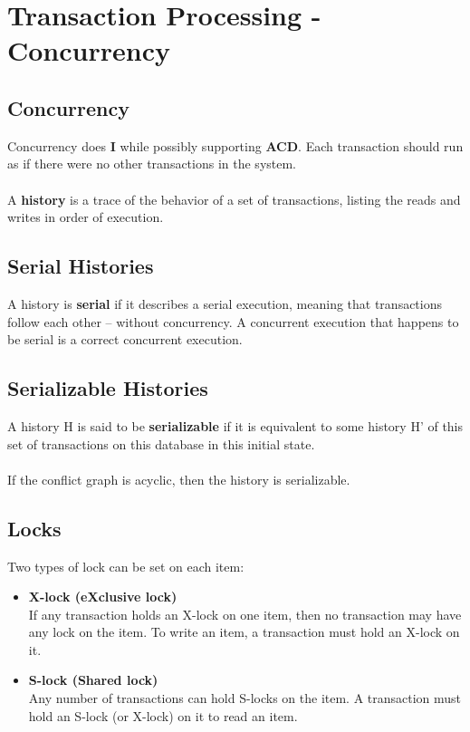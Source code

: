 \documentclass{article}
\begin{document}
\section{Transaction Processing - Concurrency}
\subsection{Concurrency}
Concurrency does \textbf{I} while possibly supporting \textbf{ACD}. Each transaction should run as if there were no other transactions in the system. \\ \\
A \textbf{history} is a trace of the behavior of a set of transactions, listing the reads and writes in order of execution.

\subsection{Serial Histories}
A history is \textbf{serial} if it describes a serial execution, meaning that transactions follow each other -- without concurrency. A concurrent execution that happens to be serial is a correct concurrent execution.

\subsection{Serializable Histories}
A history H is said to be \textbf{serializable} if it is equivalent to some history H' of this set of transactions on this database in this initial state. \\ \\
If the conflict graph is acyclic, then the history is serializable.

\subsection{Locks}
Two types of lock can be set on each item:

\begin{itemize}
	\item \textbf{X-lock (eXclusive lock)}
	\vspace{.2cm} \\
	If any transaction holds an X-lock on one item, then no transaction may have any lock on the item. To write an item, a transaction must hold an X-lock on it.
	
	\item \textbf{S-lock (Shared lock)}
	\vspace{.2cm} \\
	Any number of transactions can hold S-locks on the item. A transaction must hold an S-lock (or X-lock) on it to read an item.
\end{itemize}
\end{document}
